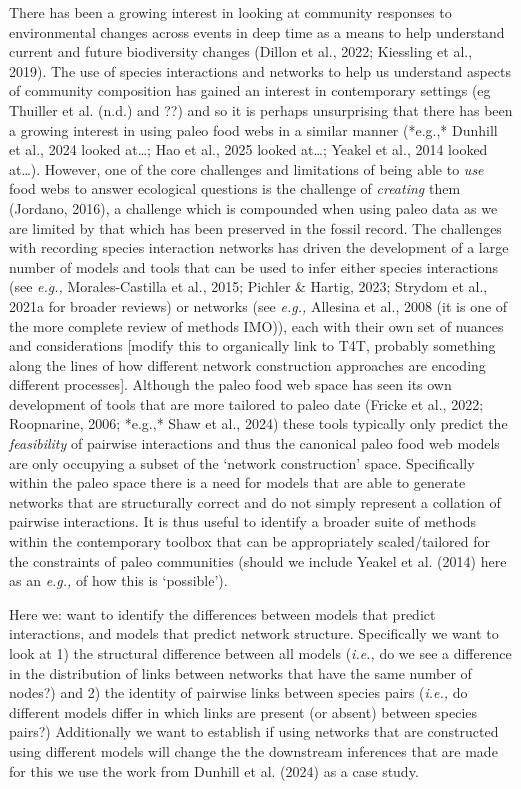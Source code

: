 \documentclass[
]{article}
\begin{document}
There has been a growing interest in looking at community responses to
environmental changes across events in deep time as a means to help
understand current and future biodiversity changes (Dillon et al., 2022;
Kiessling et al., 2019). The use of species interactions and networks to
help us understand aspects of community composition has gained an
interest in contemporary settings (eg Thuiller et al. (n.d.) and ??) and
so it is perhaps unsurprising that there has been a growing interest in
using paleo food webs in a similar manner (*e.g.,* Dunhill et al., 2024
looked at\ldots; Hao et al., 2025 looked at\ldots; Yeakel et al., 2014
looked at\ldots). However, one of the core challenges and limitations of
being able to \emph{use} food webs to answer ecological questions is the
challenge of \emph{creating} them (Jordano, 2016), a challenge which is
compounded when using paleo data as we are limited by that which has
been preserved in the fossil record. The challenges with recording
species interaction networks has driven the development of a large
number of models and tools that can be used to infer either species
interactions (see \emph{e.g.,} Morales-Castilla et al., 2015; Pichler \&
Hartig, 2023; Strydom et al., 2021a for broader reviews) or networks
(see \emph{e.g.,} Allesina et al., 2008 (it is one of the more complete
review of methods IMO)), each with their own set of nuances and
considerations {[}modify this to organically link to T4T, probably
something along the lines of how different network construction
approaches are encoding different processes{]}. Although the paleo food
web space has seen its own development of tools that are more tailored
to paleo date (Fricke et al., 2022; Roopnarine, 2006; *e.g.,* Shaw et
al., 2024) these tools typically only predict the \emph{feasibility} of
pairwise interactions and thus the canonical paleo food web models are
only occupying a subset of the `network construction' space.
Specifically within the paleo space there is a need for models that are
able to generate networks that are structurally correct and do not
simply represent a collation of pairwise interactions. It is thus useful
to identify a broader suite of methods within the contemporary toolbox
that can be appropriately scaled/tailored for the constraints of paleo
communities (should we include Yeakel et al. (2014) here as an
\emph{e.g.,} of how this is `possible').

Here we: want to identify the differences between models that predict
interactions, and models that predict network structure. Specifically we
want to look at 1) the structural difference between all models
(\emph{i.e.,} do we see a difference in the distribution of links
between networks that have the same number of nodes?) and 2) the
identity of pairwise links between species pairs (\emph{i.e.,} do
different models differ in which links are present (or absent) between
species pairs?) Additionally we want to establish if using networks that
are constructed using different models will change the the downstream
inferences that are made for this we use the work from Dunhill et al.
(2024) as a case study.
\end{document}
